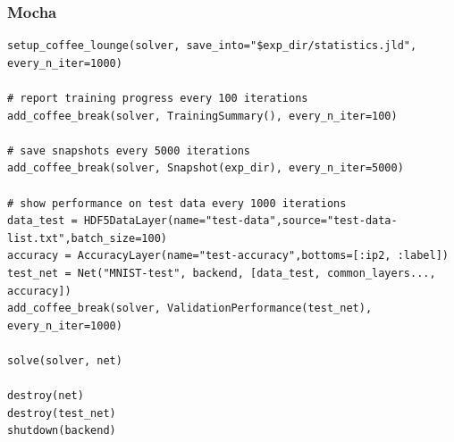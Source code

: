 \begin{frame}[fragile]
	\frametitle{Mocha}
  \begin{tiny}
  \begin{verbatim}
setup_coffee_lounge(solver, save_into="$exp_dir/statistics.jld", every_n_iter=1000)

# report training progress every 100 iterations
add_coffee_break(solver, TrainingSummary(), every_n_iter=100)

# save snapshots every 5000 iterations
add_coffee_break(solver, Snapshot(exp_dir), every_n_iter=5000)

# show performance on test data every 1000 iterations
data_test = HDF5DataLayer(name="test-data",source="test-data-list.txt",batch_size=100)
accuracy = AccuracyLayer(name="test-accuracy",bottoms=[:ip2, :label])
test_net = Net("MNIST-test", backend, [data_test, common_layers..., accuracy])
add_coffee_break(solver, ValidationPerformance(test_net), every_n_iter=1000)

solve(solver, net)

destroy(net)
destroy(test_net)
shutdown(backend)
  \end{verbatim}
  \end{tiny}
\end{frame}
